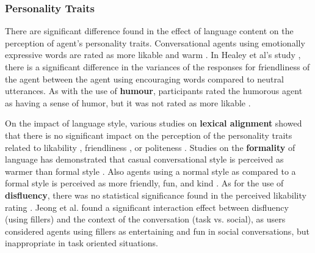 \documentclass[sigconf,screen,review, anonymous]{acmart}
\newcommand{\cmt}[1]{}%
\begin{document}



\subsubsection{Personality Traits}

There are significant difference found in the effect of language content on the perception of agent's personality traits. Conversational agents using emotionally expressive words are rated as more likable \cite{zhu2022effects}\cmt{[26]} and warm \cite{lee2019s}\cmt{[55]}. In Healey et al's study \cite{healey2013relating}\cmt{[39]}, there is a significant difference in the variances of the responses for friendliness of the agent between the agent using encouraging words compared to neutral utterances. As with the use of \textbf{humour}, participants rated the humorous agent as having a sense of humor, but it was not rated as more likable \cite{ceha2021can}\cmt{[57]}.




%

On the impact of language style, various studies on \textbf{lexical alignment} showed that there is no significant impact on the perception of the personality traits related to likability \cite{huiyang2022improving}\cmt{[17]}\cite{linnemann2018can}\cmt{[15]}, friendliness \cite{spillner2021talk}\cmt{[18]}, or politeness \cite{spillner2021talk}\cmt{[18]}. Studies on the \textbf{formality} of language has demonstrated that casual conversational style is perceived as warmer than formal style \cite{cox2022does}\cmt{[27]}. Also agents using a normal style as compared to a formal style is perceived as more friendly, fun, and kind \cite{ouchi2019should}\cmt{[59]}. As for the use of \textbf{disfluency}, there was no statistical significance found in the perceived likability rating \cite{jeong2019exploring}\cmt{[10]}\cite{pfeifer2009should}\cmt{[12]}. Jeong et al. \cite{jeong2019exploring} found a significant interaction effect between disfluency (using fillers) and the context of the conversation (task vs. social), as users considered agents using fillers as entertaining and fun in social conversations, but inappropriate in task oriented situations.
\end{document}
